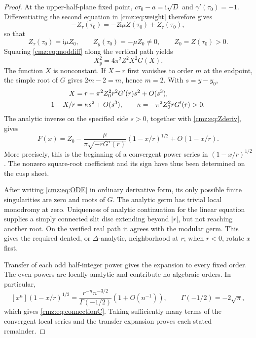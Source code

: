 \documentclass[11pt,letterpaper]{article}
\numberwithin{equation}{section}
\theoremstyle{definition}\newtheorem{definition}[theorem]{Definition}
\theoremstyle{remark}\newtheorem{remark}[theorem]{Remark}
\newcommand{\ii}{\mathrm i}
\begin{document}
\begin{proof}
At the upper-half-plane fixed point, $c\tau_0-a=\ii\sqrt D$ and $\gamma'(\tau_0)=-1$. Differentiating the second equation in \eqref{cmz:eq:weight} therefore gives
\[
-Z_\tau(\tau_0)=-2\ii\mu Z(\tau_0)+Z_\tau(\tau_0),
\]
so that
\begin{equation}
Z_\tau(\tau_0)=\ii\mu Z_0,\qquad Z_y(\tau_0)=-\mu Z_0\ne0,
\qquad Z_0=Z(\tau_0)>0.
\label{cmz:eq:Zderiv}
\end{equation}
Squaring \eqref{cmz:eq:moddiff} along the vertical path yields
\begin{equation}
X_y^2=4\pi^2Z^2X^2G(X).
\label{cmz:eq:square}
\end{equation}
The function $X$ is nonconstant. If $X-r$ first vanishes to order $m$ at the endpoint, the simple root of $G$ gives $2m-2=m$, hence $m=2$. With $s=y-y_0$,
\begin{align}
X&=r+\pi^2Z_0^2r^2G'(r)s^2+O(s^3),\notag\\
1-X/r&=\kappa s^2+O(s^3),\qquad
\kappa=-\pi^2Z_0^2rG'(r)>0.
\label{cmz:eq:quadratic}
\end{align}
The analytic inverse on the specified side $s>0$, together with \eqref{cmz:eq:Zderiv}, gives
\begin{equation}
F(x)=Z_0-\frac{\mu}{\pi\sqrt{-rG'(r)}}(1-x/r)^{1/2}
       +O(1-x/r).
\label{cmz:eq:puiseuxfirst}
\end{equation}
More precisely, this is the beginning of a convergent power series in $(1-x/r)^{1/2}$. The nonzero square-root coefficient and its sign have thus been determined on the cusp sheet.

After writing \eqref{cmz:eq:ODE} in ordinary derivative form, its only possible finite singularities are zero and roots of $G$. The analytic germ has trivial local monodromy at zero. Uniqueness of analytic continuation for the linear equation supplies a simply connected slit disc extending beyond $|r|$, but not reaching another root. On the verified real path it agrees with the modular germ. This gives the required dented, or $\Delta$-analytic, neighborhood at $r$; when $r<0$, rotate $x$ first.

Transfer of each odd half-integer power gives the expansion to every fixed order. The even powers are locally analytic and contribute no algebraic orders. In particular,
\[
[x^n](1-x/r)^{1/2}
 =\frac{r^{-n}n^{-3/2}}{\Gamma(-1/2)}(1+O(n^{-1})),
\qquad \Gamma(-1/2)=-2\sqrt\pi,
\]
which gives \eqref{cmz:eq:connectionC}. Taking sufficiently many terms of the convergent local series and the transfer expansion proves each stated remainder.
\end{proof}
\end{document}
